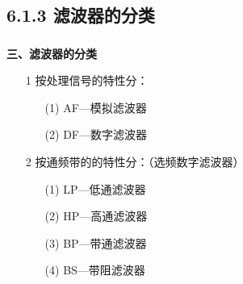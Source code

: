 \documentclass[notheorems,compress,mathserif,table]{beamer}
\begin{document}
\subsection{6.1.3 滤波器的分类}
\begin{frame}[shrink]\frametitle{}%
\textbf{三、滤波器的分类}

\begin{enumerate}
  \item[1]
     按处理信号的特性分：
      \begin{enumerate}
        \item [(1)] AF—模拟滤波器
        \item [(2)] DF—数字滤波器
      \end{enumerate}
      \par\quad%
  \item[2]
       按通频带的的特性分：（选频数字滤波器）
      \begin{enumerate}
        \item [(1)] LP—低通滤波器
        \item [(2)] HP—高通滤波器
        \item [(3)] BP—带通滤波器
        \item [(4)] BS—带阻滤波器
      \end{enumerate}
\end{enumerate}
\end{frame}
\end{document}
